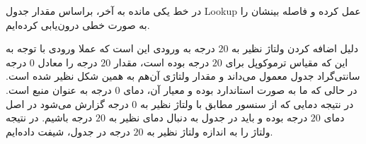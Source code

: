 \documentclass[12pt]{article}
\begin{document}
در خط یکی مانده به آخر، براساس مقدار جدول Lookup عمل کرده و فاصله بینشان را به صورت خطی درون‌یابی کرده‌ایم.

دلیل اضافه کردن ولتاژ نظیر به $20$ درجه به ورودی این است که عملا ورودی با توجه به این که مقیاس ترموکوپل برای $20$ درجه بوده است، مقدار $20$ درجه را معادل $0$ درجه سانتی‌گراد جدول معمول می‌داند و مقدار ولتاژی آن‌هم به همین شکل نظیر شده است. در حالی که  ما به صورت استاندارد بوده و معیار آن، دمای $0$‌ درجه به عنوان منبع است. در نتیجه دمایی که از سنسور مطابق با ولتاژ‌ نظیر به $0$ درجه گزارش می‌شود در اصل دمای $20$‌ درجه بوده و باید در جدول  به دنبال دمای نظیر به $20$‌ درجه باشیم. در نتیجه ولتاژ‌ را به اندازه ولتاژ نظیر به $20$‌ درجه در جدول، شیفت داده‌ایم.

 
 
 
\end{document}

